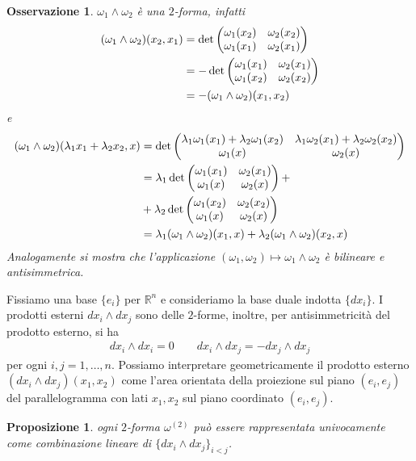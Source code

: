\documentclass[twoside, 11pt]{amsbook}
\newcommand{\0}{{(0)}}
\newcommand{\3}{{(3)}}
\theoremstyle{colonplain}
\newtheorem{prop}[thm]{Proposizione}
\theoremstyle{colondefinition}
\theoremstyle{colonremark}
\newtheorem{rmk}[thm]{Osservazione}
\numberwithin{equation}{chapter}
\begin{document}
\begin{rmk} $\omega_1 \wedge \omega_2$ è una $2$-forma, infatti
\begin{align}
    (\omega_1 \wedge \omega_2)(x_2, x_1) &= \det
    \begin{pmatrix}
        \omega_1(x_2) & \omega_2(x_2) \\
        \omega_1(x_1) & \omega_2(x_1)
    \end{pmatrix}
    \notag \\
    &= -\det
    \begin{pmatrix}
        \omega_1(x_1) & \omega_2(x_1) \\
        \omega_1(x_2) & \omega_2(x_2)
    \end{pmatrix}
    \notag \\
    &= -(\omega_1 \wedge \omega_2)(x_1, x_2) 
\end{align}
e
\begin{align}
    (\omega_1 \wedge \omega_2)(\lambda_1x_1 + \lambda_2x_2, x) &= \det
    \begin{pmatrix}
        \lambda_1\omega_1(x_1) + \lambda_2\omega_1(x_2) & \lambda_1\omega_2(x_1) + \lambda_2\omega_2(x_2) \\
        \omega_1(x) & \omega_2(x)
    \end{pmatrix}
    \notag \\
    &= \lambda_1\det
    \begin{pmatrix}
        \omega_1(x_1) & \omega_2(x_1) \\
        \omega_1(x) & \omega_2(x)
    \end{pmatrix}
    + \notag \\
    &+ \lambda_2\det
    \begin{pmatrix}
        \omega_1(x_2) & \omega_2(x_2) \\
        \omega_1(x) & \omega_2(x)
    \end{pmatrix}
    \notag \\
    &= \lambda_1(\omega_1 \wedge \omega_2)(x_1, x) + \lambda_2(\omega_1 \wedge \omega_2)(x_2, x) 
\end{align}
Analogamente si mostra che l'applicazione $(\omega_1, \omega_2) \mapsto \omega_1 \wedge \omega_2$ è bilineare e antisimmetrica.
\end{rmk}
Fissiamo una base $\{e_i\}$ per $\mathbb{R}^n$ e consideriamo la base duale indotta $\{dx_i\}$. I prodotti esterni $dx_i \wedge dx_j$ sono delle $2$-forme, inoltre, per antisimmetricità del prodotto esterno, si ha 
\begin{align}
    dx_i \wedge dx_i = 0 \qquad dx_i \wedge dx_j = -dx_j \wedge dx_j 
\end{align}
per ogni $i, j = 1, \dots, n$. Possiamo interpretare geometricamente il prodotto esterno $(dx_i \wedge dx_j)(x_1, x_2)$ come l'area orientata della proiezione sul piano $(e_i, e_j)$ del parallelogramma con lati $x_1, x_2$ sul piano coordinato $(e_i, e_j)$.
\begin{prop} ogni $2$-forma $\omega^{(2)}$ può essere rappresentata univocamente come combinazione lineare di $\{dx_i \wedge dx_j\}_{i < j}$.
\end{prop}
\end{document}
